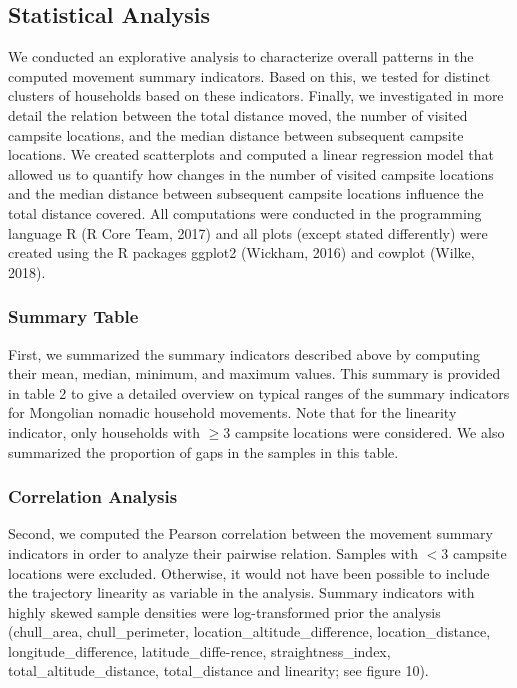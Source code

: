 \documentclass[]{elsarticle} %
\begin{document}
\hypertarget{statistical-analysis}{%
\subsection{Statistical Analysis}\label{statistical-analysis}}

We conducted an explorative analysis to characterize overall patterns in
the computed movement summary indicators. Based on this, we tested for
distinct clusters of households based on these indicators. Finally, we
investigated in more detail the relation between the total distance
moved, the number of visited campsite locations, and the median distance
between subsequent campsite locations. We created scatterplots and
computed a linear regression model that allowed us to quantify how
changes in the number of visited campsite locations and the median
distance between subsequent campsite locations influence the total
distance covered. All computations were conducted in the programming
language R (R Core Team, 2017) and all plots (except stated differently)
were created using the R packages ggplot2 (Wickham, 2016) and cowplot
(Wilke, 2018).

\hypertarget{summary-table}{%
\subsubsection{Summary Table}\label{summary-table}}

First, we summarized the summary indicators described above by computing
their mean, median, minimum, and maximum values. This summary is
provided in table 2 to give a detailed overview on typical ranges of the
summary indicators for Mongolian nomadic household movements. Note that
for the linearity indicator, only households with \(\ge 3\) campsite
locations were considered. We also summarized the proportion of gaps in
the samples in this table.

\hypertarget{correlation-analysis}{%
\subsubsection{Correlation Analysis}\label{correlation-analysis}}

Second, we computed the Pearson correlation between the movement summary
indicators in order to analyze their pairwise relation. Samples with
\(< 3\) campsite locations were excluded. Otherwise, it would not have
been possible to include the trajectory linearity as variable in the
analysis. Summary indicators with highly skewed sample densities were
log-transformed prior the analysis (chull\_area, chull\_perimeter,
location\_altitude\_difference, location\_distance,
longitude\_difference, latitude\_diffe-rence, straightness\_index,
total\_altitude\_distance, total\_distance and linearity; see figure
10).
\end{document}
